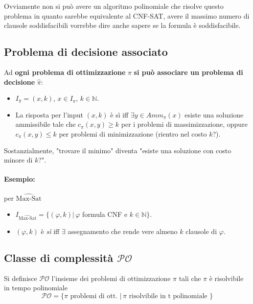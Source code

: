 Ovviamente non si può avere un algoritmo polinomiale che risolve questo problema in quanto sarebbe equivalente al CNF-SAT, avere il massimo numero di clausole soddisfacibili vorrebbe dire anche sapere se la formula è soddisfacibile.\\

\newpage

\subsection{Problema di decisione associato} 

Ad \textbf{ogni problema di ottimizzazione} $\pi$ \textbf{si può associare un problema di decisione} $\hat{\pi}$:
\begin{itemize}
	\item $I_{\hat{\pi}} = (x, k)$, $x \in I_\pi$, $k \in \mathbb{N}$.\\
	\item La risposta per l'input $(x,k)$ è sì iff $\exists y \in Amm_\pi (x)$ esiste una soluzione ammissibile tale che $c_\pi (x,y) \geq k$ per i problemi di massimizzazione, oppure $c_\pi (x,y) \leq k$ per problemi di minimizzazione (rientro nel costo $k$?).\\
\end{itemize}

Sostanzialmente, "trovare il minimo" diventa "esiste una soluzione con costo minore di $k$?".\\

\paragraph{Esempio:} per $\hat{\text{Max-Sat}}$
\begin{itemize}
	\item $I_{\hat{\text{Max-Sat}}} = \{ (\varphi, k) | \, \varphi$ formula CNF e $k \in \mathbb{N} \}$.\\
	\item $(\varphi, k)$ è \textit{sì} iff $\exists$ assegnamento che rende vere almeno $k$ clausole di $\varphi$.\\
\end{itemize}

\newpage

\subsection{Classe di complessità $\mathcal{PO}$}
Si definisce $\mathcal{PO}$ l'insieme dei problemi di ottimizzazione $\pi$ tali che $\pi$ è risolvibile in tempo polinomiale
$$ \mathcal{PO} = \{\pi \text{ problemi di ott. } | \, \pi \text{ risolvibile in t polinomiale } \}$$

